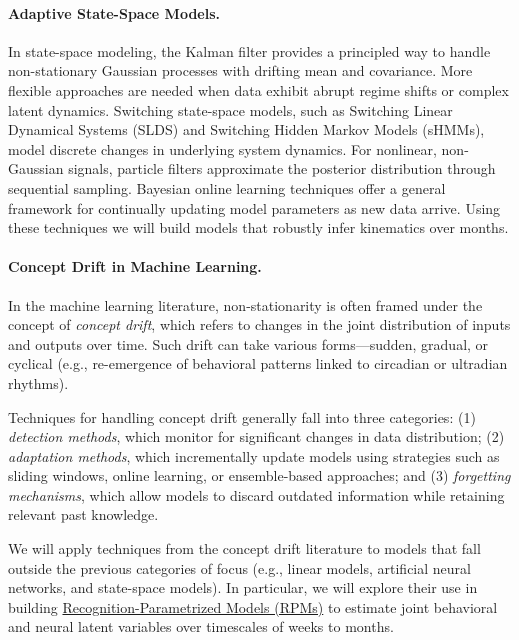 \paragraph{Adaptive State-Space Models.}

In state-space modeling, the Kalman filter provides a principled way to handle
non-stationary Gaussian processes with drifting mean and covariance. More
flexible approaches are needed when data exhibit abrupt regime shifts or
complex latent dynamics. Switching state-space models, such as Switching Linear
Dynamical Systems (SLDS) and Switching Hidden Markov Models (sHMMs), model
discrete changes in underlying system dynamics. For nonlinear, non-Gaussian
signals, particle filters approximate the posterior distribution through
sequential sampling. Bayesian online learning techniques offer a general
framework for continually updating model parameters as new data arrive.
%
Using these techniques we will build models that robustly infer kinematics
over months.

\paragraph{Concept Drift in Machine Learning.}

In the machine learning literature, non-stationarity is often framed under the
concept of \emph{concept drift}, which refers to changes in the joint
distribution of inputs and outputs over time. Such drift can take various
forms—sudden, gradual, or cyclical (e.g., re-emergence of behavioral patterns
linked to circadian or ultradian rhythms).

Techniques for handling concept drift generally fall into three categories: (1)
\emph{detection methods}, which monitor for significant changes in data
distribution; (2) \emph{adaptation methods}, which incrementally update models
using strategies such as sliding windows, online learning, or ensemble-based
approaches; and (3) \emph{forgetting mechanisms}, which allow models to discard
outdated information while retaining relevant past knowledge.

We will apply techniques from the concept drift literature to models that fall
outside the previous categories of focus (e.g., linear models, artificial neural
networks, and state-space models). In particular, we will explore their use in
building
\href{https://github.com/gatsby-sahani/rpm-aistats-2023}{Recognition-Parametrized
Models (RPMs)} to estimate joint behavioral and neural latent variables over
timescales of weeks to months.

